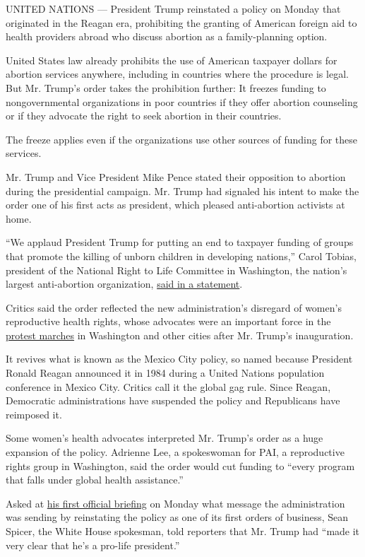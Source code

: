 UNITED NATIONS --- President Trump reinstated a policy on Monday that
originated in the Reagan era, prohibiting the granting of American
foreign aid to health providers abroad who discuss abortion as a
family-planning option.

United States law already prohibits the use of American taxpayer dollars
for abortion services anywhere, including in countries where the
procedure is legal. But Mr. Trump's order takes the prohibition further:
It freezes funding to nongovernmental organizations in poor countries if
they offer abortion counseling or if they advocate the right to seek
abortion in their countries.

The freeze applies even if the organizations use other sources of
funding for these services.

Mr. Trump and Vice President Mike Pence stated their opposition to
abortion during the presidential campaign. Mr. Trump had signaled his
intent to make the order one of his first acts as president, which
pleased anti-abortion activists at home.

``We applaud President Trump for putting an end to taxpayer funding of
groups that promote the killing of unborn children in developing
nations,'' Carol Tobias, president of the National Right to Life
Committee in Washington, the nation's largest anti-abortion
organization,
\href{http://www.nrlc.org/communications/releases/2017/release012317/}{said
in a statement}.

Critics said the order reflected the new administration's disregard of
women's reproductive health rights, whose advocates were an important
force in the
\href{https://www.nytimes.com/2017/01/21/us/women-march-protest-president-trump.html}{protest
marches} in Washington and other cities after Mr. Trump's inauguration.

It revives what is known as the Mexico City policy, so named because
President Ronald Reagan announced it in 1984 during a United Nations
population conference in Mexico City. Critics call it the global gag
rule. Since Reagan, Democratic administrations have suspended the policy
and Republicans have reimposed it.

Some women's health advocates interpreted Mr. Trump's order as a huge
expansion of the policy. Adrienne Lee, a spokeswoman for PAI, a
reproductive rights group in Washington, said the order would cut
funding to ``every program that falls under global health assistance.''

Asked at
\href{https://www.nytimes.com/interactive/2017/01/23/us/politics/spicer-white-house-briefing-live.html}{his
first official briefing} on Monday what message the administration was
sending by reinstating the policy as one of its first orders of
business, Sean Spicer, the White House spokesman, told reporters that
Mr. Trump had ``made it very clear that he's a pro-life president.''

